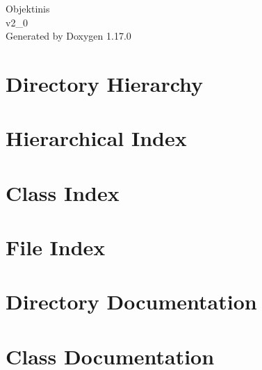 \documentclass[twoside]{book}
\newcommand{\+}{\discretionary{\mbox{\scriptsize$\hookleftarrow$}}{}{}}
\newcommand{\clearemptydoublepage}{%
    \newpage{\pagestyle{empty}\cleardoublepage}%
  }
\begin{document}
  \raggedbottom
    \hypersetup{pageanchor=false,
                bookmarksnumbered=true,
                pdfencoding=unicode
               }
  \begin{titlepage}
  \vspace*{7cm}
  \begin{center}%
  {\Large Objektinis}\\
  [1ex]\large v2\+\_\+0 \\
  \vspace*{1cm}
  {\large Generated by Doxygen 1.17.0}\\
  \end{center}
  \end{titlepage}
  \clearemptydoublepage
  \tableofcontents
  \clearemptydoublepage
  \hypersetup{pageanchor=true}

\chapter{Directory Hierarchy}

\chapter{Hierarchical Index}

\chapter{Class Index}

\chapter{File Index}

\chapter{Directory Documentation}

\chapter{Class Documentation}


\end{document}
